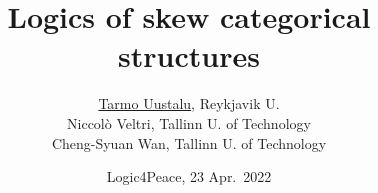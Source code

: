 \documentclass[10pt,t]{beamer}
\begin{document}
\title{Logics of skew categorical structures}

\author{\underline{Tarmo Uustalu}, Reykjavik U. \\ Niccol\`o Veltri, Tallinn U. of Technology \\ Cheng-Syuan Wan, Tallinn U. of Technology}



\date{Logic4Peace, 23 Apr.\ 2022}

\begin{frame}

\maketitle

\end{frame}
\end{document}
